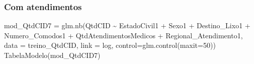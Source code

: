 \documentclass[
]{article}
\newenvironment{Shaded}{\begin{snugshade}}{\end{snugshade}}
\newcommand{\AttributeTok}[1]{\textcolor[rgb]{0.77,0.63,0.00}{#1}}
\newcommand{\DecValTok}[1]{\textcolor[rgb]{0.00,0.00,0.81}{#1}}
\newcommand{\FunctionTok}[1]{\textcolor[rgb]{0.00,0.00,0.00}{#1}}
\newcommand{\NormalTok}[1]{#1}
\newcommand{\OtherTok}[1]{\textcolor[rgb]{0.56,0.35,0.01}{#1}}
\newcommand{\SpecialCharTok}[1]{\textcolor[rgb]{0.00,0.00,0.00}{#1}}
\newcommand{\StringTok}[1]{\textcolor[rgb]{0.31,0.60,0.02}{#1}}
\begin{document}
\hypertarget{com-atendimentos}{%
\subsubsection{Com atendimentos}\label{com-atendimentos}}

\begin{Shaded}
\begin{Highlighting}[]
\NormalTok{mod\_QtdCID7 }\OtherTok{=} \FunctionTok{glm.nb}\NormalTok{(QtdCID }\SpecialCharTok{\textasciitilde{}}\NormalTok{ EstadoCivil1 }\SpecialCharTok{+}\NormalTok{ Sexo1 }\SpecialCharTok{+} 
\NormalTok{                       Destino\_Lixo1 }\SpecialCharTok{+}\NormalTok{ Numero\_Comodos1 }\SpecialCharTok{+}\NormalTok{ QtdAtendimentosMedicos }\SpecialCharTok{+}
\NormalTok{                       Regional\_Atendimento1, }\AttributeTok{data =}\NormalTok{ treino\_QtdCID, }\AttributeTok{link =} \StringTok{\textquotesingle{}log\textquotesingle{}}\NormalTok{, }\AttributeTok{control=}\FunctionTok{glm.control}\NormalTok{(}\AttributeTok{maxit=}\DecValTok{50}\NormalTok{))}
\FunctionTok{TabelaModelo}\NormalTok{(mod\_QtdCID7)}
\end{Highlighting}
\end{Shaded}
\end{document}

